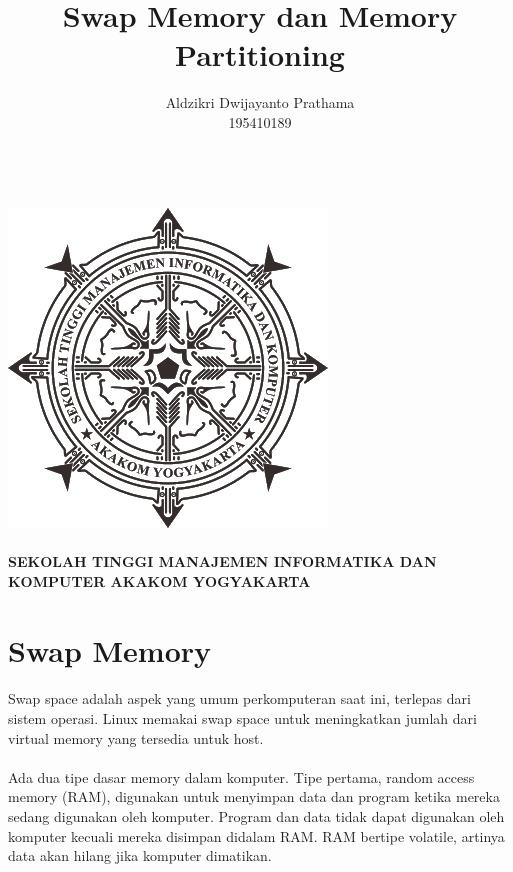 \documentclass[a4paper,12pt]{article}
\begin{document}
\title{Swap Memory dan Memory Partitioning}
\author{Aldzikri Dwijayanto Prathama 
	\\195410189}
\makeatletter
\begin{titlepage}
	\begin{center}
		{\huge \bfseries \@title }\\[14ex]
		\includegraphics[scale=.8]{logo}\\[4ex]
		{\large \@author}\\[20ex]
		{\large \bfseries {SEKOLAH TINGGI MANAJEMEN INFORMATIKA DAN KOMPUTER
				AKAKOM YOGYAKARTA}}
	\end{center}


\end{titlepage}
\makeatother
\newpage
\tableofcontents
\newpage
\section{Swap Memory}
\paragraph{}
Swap space adalah aspek yang umum perkomputeran saat ini, terlepas dari sistem operasi. Linux memakai swap space untuk meningkatkan jumlah dari virtual memory yang tersedia untuk host.

\paragraph{}
Ada dua tipe dasar memory dalam komputer. Tipe pertama, random access memory (RAM), digunakan untuk menyimpan data dan program ketika mereka sedang digunakan oleh komputer. Program dan data tidak dapat digunakan oleh komputer kecuali mereka disimpan didalam RAM. RAM bertipe volatile, artinya data akan hilang jika komputer dimatikan.
\end{document}
